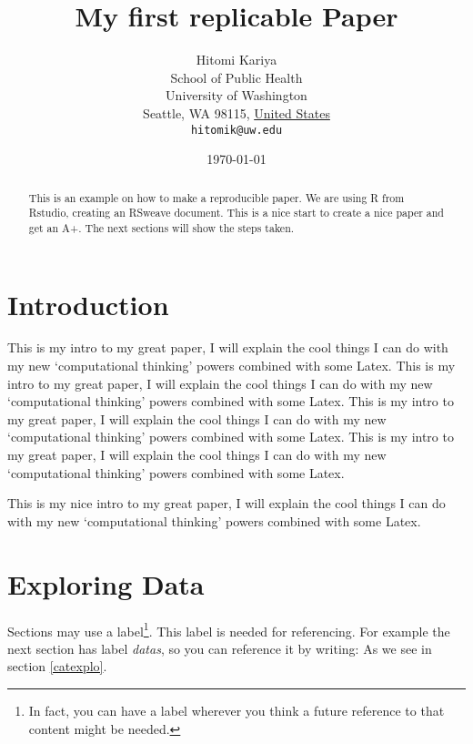 \documentclass[11pt]{article}
\title{My first replicable Paper}
\author{
        Hitomi Kariya\\
        School of Public Health\\
        University of Washington\\
        Seattle, WA 98115, \underline{United States}\\
        \texttt{hitomik@uw.edu}
}
\date{\today}
\begin{document}


\maketitle %


\begin{abstract}
This is an example on how to make a reproducible paper. We are using R from Rstudio, creating an RSweave document. This is a nice start to create a nice paper and get an A+. The next sections will show the steps taken.
\end{abstract}

\section{Introduction}\label{intro}  

This is my intro to my great paper, I will explain the cool things I can do with my new `computational thinking' powers combined with some Latex. This is my intro to my great paper, I will explain the cool things I can do with my new `computational thinking' powers combined with some Latex. This is my intro to my great paper, I will explain the cool things I can do with my new `computational thinking' powers combined with some Latex. This is my intro to my great paper, I will explain the cool things I can do with my new `computational thinking' powers combined with some Latex.

This is my nice intro to my great paper, 
I will explain the cool things 
I can do with my new `computational thinking' 
powers
combined with some Latex.


\section{Exploring Data}\label{explo}

Sections may use a label\footnote{In fact, you can have a label wherever you think a future reference to that content might be needed.}. This label is needed for referencing. For example the next section has label \emph{datas}, so you can reference it by writing: As we see in section \ref{catexplo}.
\end{document}
